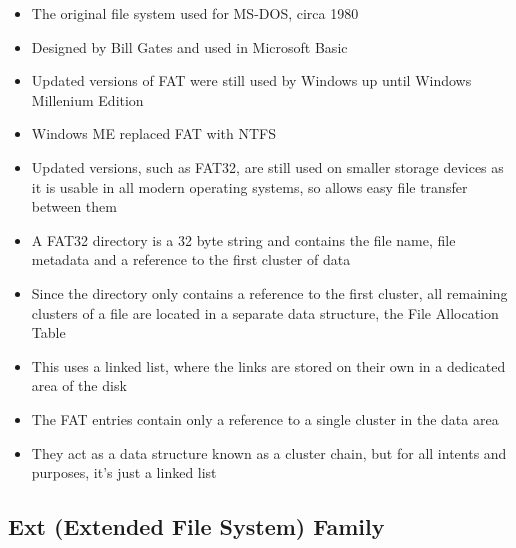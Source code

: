 \begin{itemize}
  \item The original file system used for MS-DOS, circa 1980
  \item Designed by Bill Gates and used in Microsoft Basic
  \item Updated versions of FAT were still used by Windows up until Windows Millenium Edition
  \item Windows ME replaced FAT with NTFS
  \item Updated versions, such as FAT32, are still used on smaller storage devices as it is usable in all modern operating systems, so allows easy file transfer between them
  \item A FAT32 directory is a 32 byte string and contains the file name, file metadata and a reference to the first cluster of data
  \item Since the directory only contains a reference to the first cluster, all remaining clusters of a file are located in a separate data structure, the File Allocation Table
  \item This uses a linked list, where the links are stored on their own in a dedicated area of the disk
  \item The FAT entries contain only a reference to a single cluster in the data area
  \item They act as a data structure known as a cluster chain, but for all intents and purposes, it's just a linked list
\end{itemize}

\subsection*{Ext (Extended File System) Family}


